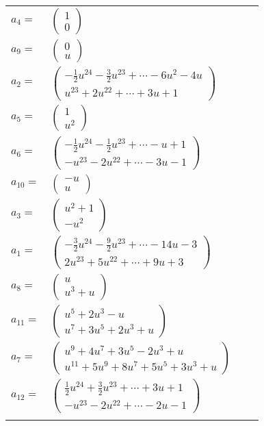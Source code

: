 \documentclass[1p]{elsarticle_modified}
\theoremstyle{definition}
\begin{document}
\begin{tabular}{m{7pt} m{180pt} m{7pt} m{180pt} }
\flushright $a_{4}=$&$\begin{pmatrix}1\\0\end{pmatrix}$ \\
\flushright $a_{9}=$&$\begin{pmatrix}0\\u\end{pmatrix}$ \\
\flushright $a_{2}=$&$\begin{pmatrix}-\frac{1}{2} u^{24}-\frac{3}{2} u^{23}+\cdots-6 u^2-4 u\\u^{23}+2 u^{22}+\cdots+3 u+1\end{pmatrix}$ \\
\flushright $a_{5}=$&$\begin{pmatrix}1\\u^2\end{pmatrix}$ \\
\flushright $a_{6}=$&$\begin{pmatrix}-\frac{1}{2} u^{24}-\frac{1}{2} u^{23}+\cdots- u+1\\- u^{23}-2 u^{22}+\cdots-3 u-1\end{pmatrix}$ \\
\flushright $a_{10}=$&$\begin{pmatrix}- u\\u\end{pmatrix}$ \\
\flushright $a_{3}=$&$\begin{pmatrix}u^2+1\\- u^2\end{pmatrix}$ \\
\flushright $a_{1}=$&$\begin{pmatrix}-\frac{3}{2} u^{24}-\frac{9}{2} u^{23}+\cdots-14 u-3\\2 u^{23}+5 u^{22}+\cdots+9 u+3\end{pmatrix}$ \\
\flushright $a_{8}=$&$\begin{pmatrix}u\\u^3+u\end{pmatrix}$ \\
\flushright $a_{11}=$&$\begin{pmatrix}u^5+2 u^3- u\\u^7+3 u^5+2 u^3+u\end{pmatrix}$ \\
\flushright $a_{7}=$&$\begin{pmatrix}u^9+4 u^7+3 u^5-2 u^3+u\\u^{11}+5 u^9+8 u^7+5 u^5+3 u^3+u\end{pmatrix}$ \\
\flushright $a_{12}=$&$\begin{pmatrix}\frac{1}{2} u^{24}+\frac{3}{2} u^{23}+\cdots+3 u+1\\- u^{23}-2 u^{22}+\cdots-2 u-1\end{pmatrix}$\\&\end{tabular}
\end{document}
